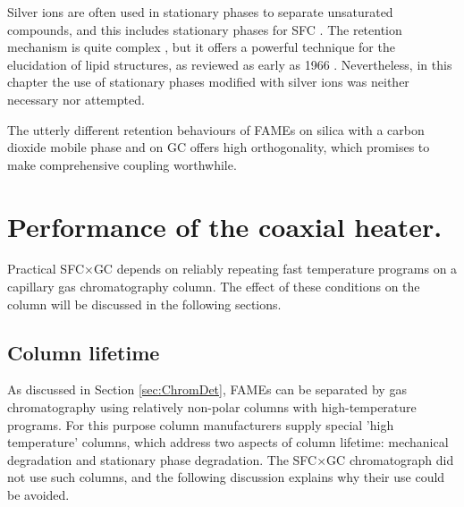 Silver ions are often used in stationary phases to separate unsaturated
compounds, and this includes stationary phases for SFC \autocite{Sandra2002,
Potgieter2013}. The retention mechanism is quite complex
\autocite{Nikolova-Damyanova2019}, but it offers a powerful technique for the
elucidation of lipid structures, as reviewed as early as 1966
\autocite{Morris1966}. Nevertheless, in this chapter the use of stationary
phases modified with silver ions was neither necessary nor attempted.


The utterly different retention behaviours of FAMEs on silica with a carbon
dioxide mobile phase and on GC offers high orthogonality, which promises to make
comprehensive coupling worthwhile.

\section[Coaxial heater performance.]{Performance of the coaxial heater.}

Practical SFC×GC depends on reliably repeating fast temperature programs on a
capillary gas chromatography column. The effect of these conditions on the
column will be discussed in the following sections.

\subsection{Column lifetime}

As discussed in Section \ref{sec:ChromDet}, FAMEs can be separated by gas
chromatography using relatively non-polar columns with high-temperature
programs. For this purpose column manufacturers supply special 'high
temperature' columns, which address two aspects of column lifetime: mechanical
degradation and stationary phase degradation. The SFC×GC chromatograph did not
use such columns, and the following discussion explains why their use could be
avoided.

